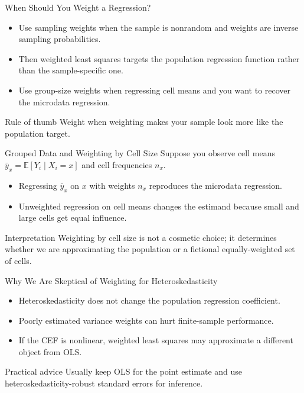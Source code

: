 \documentclass[11pt,aspectratio=169]{beamer}
\newcommand{\E}{\mathbb{E}}
\newcommand{\derivbutton}[1]{\vspace{0.4em}\hfill\hyperlink{app:#1}{\beamerbutton{Appendix details}}}
\begin{document}
\begin{frame}{When Should You Weight a Regression?}
  \begin{itemize}
    \item Use sampling weights when the sample is nonrandom and weights are inverse sampling probabilities.
    \item Then weighted least squares targets the population regression function rather than the sample-specific one.
    \item Use group-size weights when regressing cell means and you want to recover the microdata regression.
  \end{itemize}
  \begin{block}{Rule of thumb}
    Weight when weighting makes your sample look more like the population target.
  \end{block}
\end{frame}

\begin{frame}{Grouped Data and Weighting by Cell Size}
  \hypertarget{main:group-weight}{}
  Suppose you observe cell means \(\bar{y}_x=\E[Y_i \mid X_i=x]\) and cell frequencies \(n_x\).
  \begin{itemize}
    \item Regressing \(\bar{y}_x\) on \(x\) with weights \(n_x\) reproduces the microdata regression.
    \item Unweighted regression on cell means changes the estimand because small and large cells get equal influence.
  \end{itemize}
  \begin{block}{Interpretation}
    Weighting by cell size is not a cosmetic choice; it determines whether we are approximating the population or a fictional equally-weighted set of cells.
  \end{block}
  \derivbutton{grouped-proof}
\end{frame}

\begin{frame}{Why We Are Skeptical of Weighting for Heteroskedasticity}
  \begin{itemize}
    \item Heteroskedasticity does not change the population regression coefficient.
    \item Poorly estimated variance weights can hurt finite-sample performance.
    \item If the CEF is nonlinear, weighted least squares may approximate a different object from OLS.
  \end{itemize}
  \begin{block}{Practical advice}
    Usually keep OLS for the point estimate and use heteroskedasticity-robust standard errors for inference.
  \end{block}
\end{frame}
\end{document}
